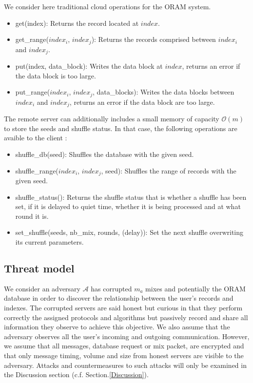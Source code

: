 \documentclass[english,oneside,twocolumn]{article}
\begin{document}
We consider here traditional cloud operations for the ORAM system.
\begin{itemize}
 \item get(index): Returns the record located at $index$.
 \item get\_range($index_i$, $index_j$): Returns the records comprised between $index_i$ and $index_j$.
 \item put(index, data\_block):  Writes the data block at $index$, returns an error if the data block is too large.
 \item put\_range($index_i$, $index_j$, data\_blocks): Writes the data blocks between $index_i$ and $index_j$, returns an error if the data block are too large.
\end{itemize}

The remote server can additionally includes a small memory of capacity $\mathcal{O}(m)$ to store the seeds and shuffle status. In that case, the following operations are avaible to the client :
\begin{itemize}
 \item shuffle\_db(seed): Shuffles the database with the given seed.
 \item shuffle\_range($index_i$, $index_j$, seed): Shuffles the range of records with the given seed.
 \item shuffle\_status(): Returns the shuffle status that is whether a shuffle has been set, if it is delayed to quiet time, whether it is being processed and at what round it is.
 \item set\_shuffle(seeds, nb\_mix, rounds, (delay)): Set the next shuffle overwriting its current parameters.
\end{itemize}


\subsection{Threat model}
We consider an adversary $\mathcal{A}$ has corrupted $m_{a}$ mixes and potentially the ORAM database in order to discover the relationship between the user's records and indexes.
The corrupted servers are said honest but curious in that they perform correctly the assigned protocols and algorithms but passively record and share all information they observe to achieve this objective.
We also assume that the adversary observes all the user's incoming and outgoing communication. However, we assume that all messages, database request or mix packet, are encrypted and that only message timing, volume and size from honest servers are visible to the adversary.
Attacks and countermeasures to such attacks will only be examined in the Discussion section (c.f. Section.\ref{Discussion}).
\end{document}
